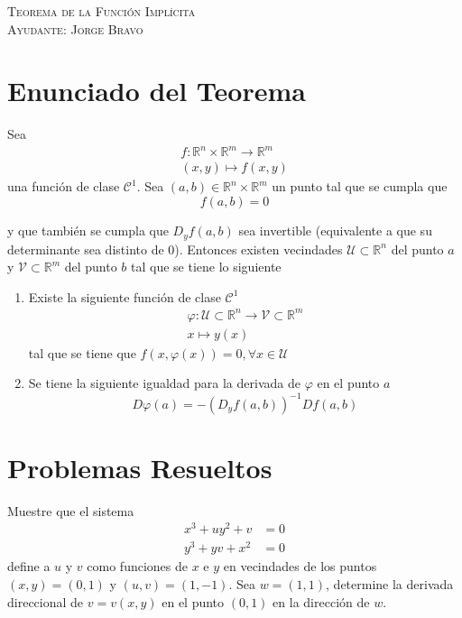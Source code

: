 \documentclass[a4paper,oneside,10.5pt]{article}
\newcommand\RR{\mathbb{R}}
\theoremstyle{definition}
\theoremstyle{plain}
\theoremstyle{remark}
\theoremstyle{theorem}
\begin{document}
\begin{center}
{\Large \textsc{Teorema de la Función Implícita}}\\
\vspace{1em}
\textsc{Ayudante: Jorge Bravo}\\
\end{center}

\section*{Enunciado del Teorema}
 Sea 
\begin{gather*}
    f : \RR^n \times \RR^m \to \RR^m\\
    (x, y) \mapsto f(x, y)
\end{gather*}
una función de clase $\mathcal{C}^{1}$. Sea $(a, b) \in \RR^n \times \RR^m$ un punto tal que se cumpla que
\begin{equation*}
    f(a, b) = 0
\end{equation*}

y que también se cumpla que $D_yf(a, b)$ sea invertible (equivalente a que su determinante sea distinto de $0$). Entonces existen vecindades $\mathcal{U} \subset \RR^n$ del punto $a$ y $\mathcal{V} \subset \RR^m$ del punto $b$ tal que se tiene lo siguiente

\begin{enumerate}
    \item Existe la siguiente funci\'on de clase $\mathcal{C}^1$
    \begin{gather*}
        \varphi : \mathcal{U} \subset \RR^n \to \mathcal{V} \subset \RR^m\\
        x \mapsto y(x)
    \end{gather*}
    tal que se tiene que $f(x, \varphi(x)) = 0, \forall x \in \mathcal{U}$
    \item Se tiene la siguiente igualdad para la derivada de $\varphi$ en el punto $a$
    \begin{equation*}
        D\varphi(a) = -(D_{y}f(a, b))^{-1} Df(a, b)
    \end{equation*}
\end{enumerate}

\section*{Problemas Resueltos}
\prob Muestre que el sistema
\begin{align*}
    x^3 + uy^2 + v &= 0\\
    y^3 + yv + x^2 &= 0
\end{align*}
define a $u$ y $v$ como funciones de $x$ e $y$ en vecindades de los puntos $(x, y) = (0, 1)$ y $(u, v) = (1, -1)$. Sea $w = (1, 1)$, determine la derivada direccional de $v = v(x, y)$ en el punto $(0, 1)$ en la dirección de $w$.
\end{document}
